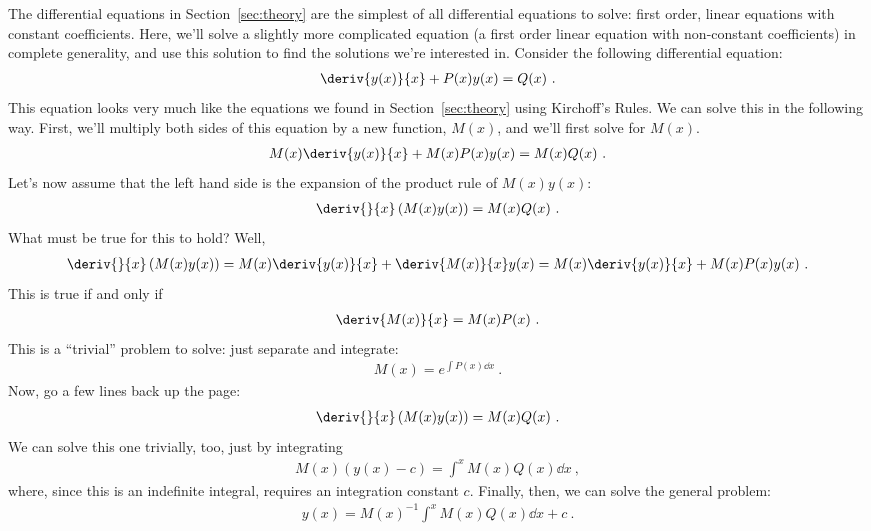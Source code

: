 \documentclass[12pt]{article}
\begin{document}
The differential equations in Section~\ref{sec:theory} are the
simplest of all differential equations to solve: first order, linear
equations with constant coefficients.  Here, we'll solve a slightly
more complicated equation (a first order linear equation with
non-constant coefficients) in complete generality, and use this
solution to find the solutions we're interested in.  Consider the
following differential equation:
\begin{gather*}
  \deriv{y(x)}{x} + P(x) y(x) = Q(x)\ .
\end{gather*}
This equation looks very much like the equations we found in
Section~\ref{sec:theory} using Kirchoff's Rules.  We can solve this in
the following way.  First, we'll multiply both sides of this equation
by a new function, $M(x)$, and we'll first solve for $M(x)$.
\begin{gather*}
  M(x) \deriv{y(x)}{x} + M(x) P(x) y(x) = M(x) Q(x)\ .
\end{gather*}
Let's now assume that the left hand side is the expansion of the
product rule of $M(x) y(x)$:
\begin{gather*}
  \deriv{}{x} \left( M(x) y(x) \right) = M(x) Q(x)\ .
\end{gather*}
What must be true for this to hold?  Well,
\begin{gather*}
  \deriv{}{x} \left( M(x) y(x) \right) = 
  M(x) \deriv{y(x)}{x} + \deriv{M(x)}{x} y(x) = 
  M(x) \deriv{y(x)}{x} + M(x) P(x) y(x)\ .
\end{gather*}
This is true if and only if
\begin{gather*}
  \deriv{M(x)}{x} = M(x) P(x)\ .
\end{gather*}
This is a ``trivial'' problem to solve: just separate and integrate:
\begin{gather*}
  M(x) = e^{\int P(x) \dd x}\ .
\end{gather*}
Now, go a few lines back up the page:
\begin{gather*}
  \deriv{}{x} \left( M(x) y(x) \right) = M(x) Q(x)\ .
\end{gather*}
We can solve this one trivially, too, just by integrating
\begin{gather*}
  M(x) \left( y(x) -c \right) = \int^x M(x) Q(x) \dd x\ ,
\end{gather*}
where, since this is an indefinite integral, requires an integration
constant $c$.  Finally, then, we can solve the general problem:
\begin{gather*}
  y(x) = M(x)^{-1} \int^x M(x) Q(x) \dd x + c\ .
\end{gather*}
\end{document}
